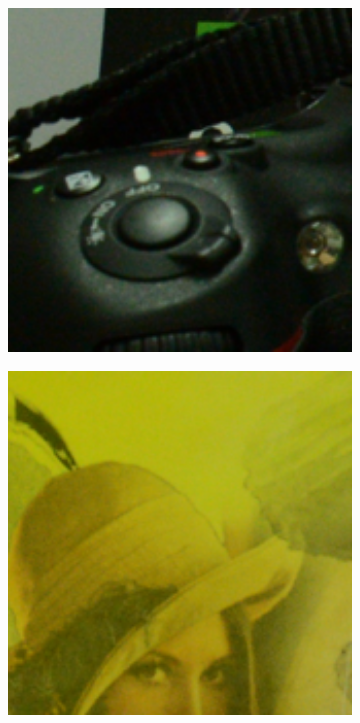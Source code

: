 \begin{figure}
\begin{subfigure}[t]{0.19\textwidth}
    \end{subfigure}
    \hfill
    \begin{subfigure}[t]{0.19\textwidth}
        \centering
        \includegraphics[width=1\textwidth]{images/guided/resize_CC_Noisy_Nikon_D600_ISO_3200_C2_67.png}
    \end{subfigure}
    \hfill
    \begin{subfigure}[t]{0.19\textwidth}
        \centering
        \includegraphics[width=1\textwidth]{images/guided/resize_CC_Noisy_Nikon_D800_ISO_1600_B2_80.png}

\end{subfigure}
\end{figure}
